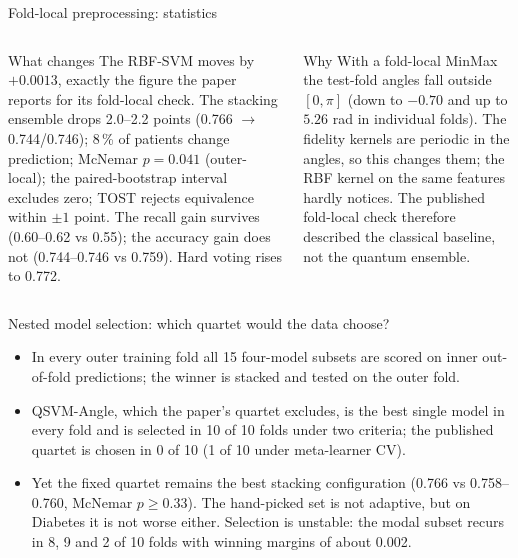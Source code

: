 \documentclass[aspectratio=169,10pt,t,xcolor={table}]{beamer}
\newcommand{\tabdir}{../reimplementation/tex/slides/}
\begin{document}
\begin{frame}{Fold-local preprocessing: statistics}
\begin{center}

\end{center}
\begin{columns}[T]
\begin{block}{What changes}
\footnotesize The RBF-SVM moves by $+0.0013$, exactly the figure the paper reports for its fold-local check. The stacking ensemble drops 2.0--2.2 points (0.766 $\to$ 0.744/0.746); 8\,\% of patients change prediction; McNemar $p=0.041$ (outer-local); the paired-bootstrap interval excludes zero; TOST rejects equivalence within $\pm1$ point. The recall gain survives (0.60--0.62 vs 0.55); the accuracy gain does not (0.744--0.746 vs 0.759). Hard voting rises to 0.772.
\end{block}
\begin{block}{Why}
\footnotesize With a fold-local MinMax the test-fold angles fall outside $[0,\pi]$ (down to $-0.70$ and up to $5.26$ rad in individual folds). The fidelity kernels are periodic in the angles, so this changes them; the RBF kernel on the same features hardly notices. The published fold-local check therefore described the classical baseline, not the quantum ensemble.
\end{block}
\end{columns}
\end{frame}

\begin{frame}{Nested model selection: which quartet would the data choose?}
\begin{center}

\end{center}
\begin{itemize}\footnotesize
  \item In every outer training fold all 15 four-model subsets are scored on inner out-of-fold predictions; the winner is stacked and tested on the outer fold.
  \item QSVM-Angle, which the paper's quartet excludes, is the best single model in every fold and is selected in 10 of 10 folds under two criteria; the published quartet is chosen in 0 of 10 (1 of 10 under meta-learner CV).
  \item Yet the fixed quartet remains the best stacking configuration (0.766 vs 0.758--0.760, McNemar $p\ge0.33$). The hand-picked set is not adaptive, but on Diabetes it is not worse either. Selection is unstable: the modal subset recurs in 8, 9 and 2 of 10 folds with winning margins of about 0.002.
\end{itemize}
\end{frame}
\end{document}

